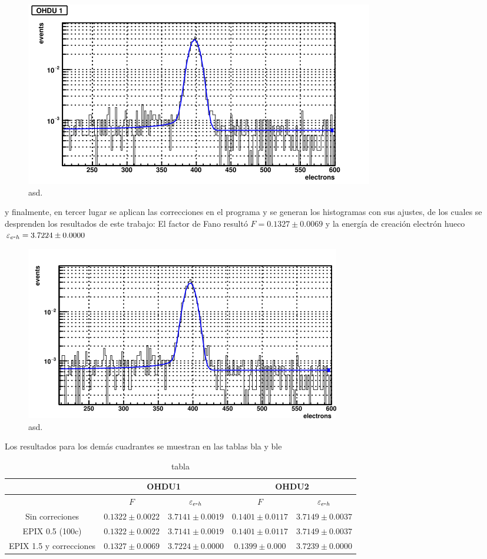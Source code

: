 \begin{figure}[H]
    \centering
        \includegraphics[scale=1]{pngs/OHDU1_EPIX15_sin_correcciones.png}
    \caption{\footnotesize{asd.}}
    \label{fig:OHDU1_EPIX15}
\end{figure}
y finalmente, en tercer lugar se aplican las correcciones en el programa y se generan los histogramas con sus ajustes, de los cuales se desprenden los resultados de este trabajo: El factor de Fano resultó $F = 0.1327 \pm 0.0069$ y la energía de creación electrón hueco $\varepsilon_{e\mbox{-}h} = 3.7224 \pm 0.0000$
\begin{figure}[H]
    \centering
        \includegraphics[scale=1]{pngs/OHDU1_EPIX15_Correcciones.png}
    \caption{\footnotesize{asd.}}
    \label{fig:OHDU1_EPIX15_corregido}
\end{figure}
Los resultados para los demás cuadrantes se muestran en las tablas bla y ble
\begin{table}[H]
\centering
\begin{tabular}{@{}ccccc@{}}
\toprule
                & \multicolumn{2}{c}{OHDU1}                 & \multicolumn{2}{c}{OHDU2}                 \\ \midrule
                & $F$                 & $\varepsilon_{e\mbox{-}h}$ & $F$                 & $\varepsilon_{e\mbox{-}h}$ \\
Sin correciones & $0.1322 \pm 0.0022$ & $3.7141 \pm 0.0019$ & $0.1401 \pm 0.0117$ & $3.7149 \pm 0.0037$ \\
EPIX 0.5 (100c) & $0.1322 \pm 0.0022$ & $3.7141 \pm 0.0019$ & $0.1401 \pm 0.0117$ & $3.7149 \pm 0.0037$ \\
EPIX 1.5 y correcciones    & $0.1327 \pm 0.0069$ & $3.7224 \pm 0.0000$ & $0.1399 \pm 0.000$ & $3.7239 \pm 0.0000$ \\ \bottomrule
\end{tabular}
\caption{tabla}
\label{tab:Correciones0}
\end{table}
